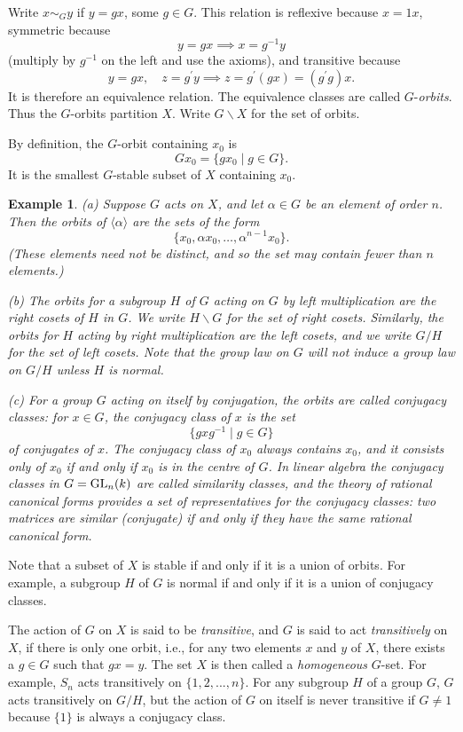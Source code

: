 \documentclass[a4paper,11pt,final,openany]{memoir}%
\newtheorem{example}[X]{Example}
\theoremstyle{nonumberplain}
\begin{document}
Write $x\sim_{G}y$ if $y=gx$, some $g\in G$. This relation is reflexive
because $x=1x$, symmetric because
\[
y=gx\implies x=g^{-1}y
\]
(multiply by $g^{-1}$ on the left and use the axioms), and transitive because
\[
y=gx,\quad z=g^{\prime}y\implies z=g^{\prime}(gx)=(g^{\prime}g)x.
\]
It is therefore an equivalence relation. The equivalence classes are called
$G$-\emph{orbits}.%
Thus the $G$-orbits partition $X$. Write $G\backslash X$ for the set of orbits.

By definition, the $G$-orbit containing $x_{0}$ is
\[
Gx_{0}=\{gx_{0}\mid g\in G\}.
\]
It is the smallest $G$-stable subset of $X$ containing $x_{0}$.

\begin{example}
\label{ga03} (a) Suppose $G$ acts on $X$, and let $\alpha\in G$ be an element
of order $n$. Then the orbits of $\langle\alpha\rangle$ are the sets of the
form
\[
\{x_{0},\alpha x_{0},\ldots,\alpha^{n-1}x_{0}\}.
\]
(These elements need not be distinct, and so the set may contain fewer than
$n$ elements.)

(b) The orbits for a subgroup $H$ of $G$ acting on $G$ by left multiplication
are the right cosets of $H$ in $G$. We write $H\backslash G$ for the set of
right cosets. Similarly, the orbits for $H$ acting by right multiplication are
the left cosets, and we write $G/H$ for the set of left cosets. Note that the
group law on $G$ will \textit{not\/} induce a group law on $G/H$ unless $H$ is normal.

(c) For a group $G$ acting on itself by conjugation, the orbits are called
\emph{conjugacy classes:\/}%
for $x\in G$, the conjugacy class of $x$ is the set
\[
\{gxg^{-1}\mid g\in G\}
\]
of conjugates of $x$. The conjugacy class of $x_{0}$ always contains $x_{0}$,
and it consists only of $x_{0}$ if and only if $x_{0}$ is in the centre of
$G$. In linear algebra the conjugacy classes in $G=\operatorname{GL}_{n}(k)$ are called
similarity classes, and the theory of rational canonical forms provides a set
of representatives for the conjugacy classes: two matrices are similar
(conjugate) if and only if they have the same rational canonical form.
\end{example}

Note that a subset of $X$ is stable if and only if it is a union of orbits.
For example, a subgroup $H$ of $G$ is normal if and only if it is a union of
conjugacy classes.

The action of $G$ on $X$ is said to be \emph{transitive}, and $G$ is said to
act \emph{transitively\/}%
on $X$, if there is only one orbit, i.e., for any two elements $x$ and $y$ of
$X$, there exists a $g\in G$ such that $gx=y$. The set $X$ is then called a
\emph{homogeneous}%
$G$-set. For example, $S_{n}$ acts transitively on $\{1,2,...,n\}$. For any
subgroup $H$ of a group $G$, $G$ acts transitively on $G/H$, but the action of
$G$ on itself is never transitive if $G\neq1$ because $\{1\}$ is always a
conjugacy class.
\end{document}
